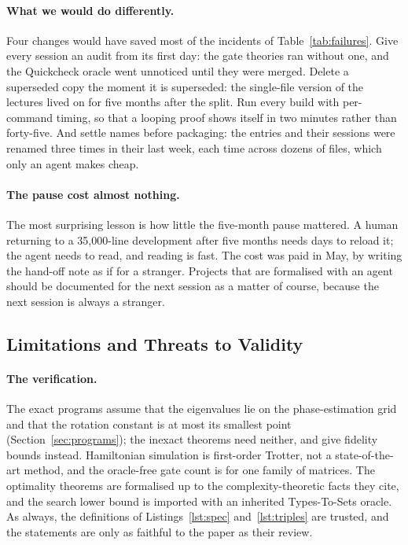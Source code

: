 \paragraph{What we would do differently.} Four changes would have saved most of the incidents of
Table~\ref{tab:failures}. Give every session an audit from its first day: the gate theories ran without
one, and the Quickcheck oracle went unnoticed until they were merged. Delete a superseded copy the
moment it is superseded: the single-file version of the lectures lived on for five months after the
split. Run every build with per-command timing, so that a looping proof shows itself in two minutes
rather than forty-five. And settle names before packaging: the entries and their sessions were renamed
three times in their last week, each time across dozens of files, which only an agent makes cheap.

\paragraph{The pause cost almost nothing.} The most surprising lesson is how little the five-month
pause mattered. A human returning to a 35{,}000-line development after five months needs days to
reload it; the agent needs to read, and reading is fast. The cost was paid in May, by writing the
hand-off note as if for a stranger. Projects that are formalised with an agent should be documented for
the next session as a matter of course, because the next session is always a stranger.

\subsection{Limitations and Threats to Validity}\label{sec:limitations}

\paragraph{The verification.} The exact programs assume that the eigenvalues lie on the
phase-estimation grid and that the rotation constant is at most its smallest point
(Section~\ref{sec:programs}); the inexact theorems need neither, and give fidelity bounds instead. Hamiltonian simulation is first-order Trotter, not a state-of-the-art
method, and the oracle-free gate count is for one family of matrices. The optimality theorems are
formalised up to the complexity-theoretic facts they cite, and the search lower bound is imported with an
inherited Types-To-Sets oracle. As always, the definitions of Listings~\ref{lst:spec} and~\ref{lst:triples}
are trusted, and the statements are only as faithful to the paper as their review.


